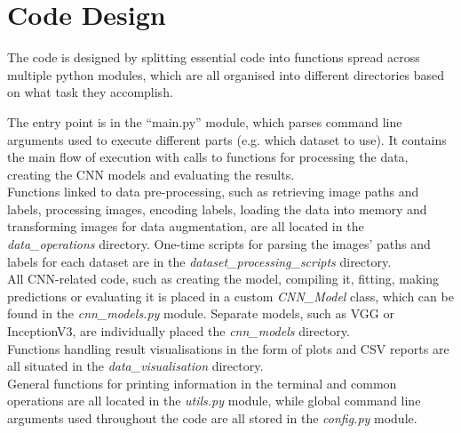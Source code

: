 
\section{Code Design}

The code is designed by splitting essential code into functions spread across multiple python modules, which are all organised into different directories based on what task they accomplish.

The entry point is in the ``main.py'' module, which parses command line arguments used to execute different parts (e.g. which dataset to use). It contains the main flow of execution with calls to functions for processing the data, creating the CNN models and evaluating the results.\\

Functions linked to data pre-processing, such as retrieving image paths and labels, processing images, encoding labels, loading the data into memory and transforming images for data augmentation, are all located in the \textit{data\_operations} directory. One-time scripts for parsing the images' paths and labels for each dataset are in the \textit{dataset\_processing\_scripts} directory.\\

All CNN-related code, such as creating the model, compiling it, fitting, making predictions or evaluating it is placed in a custom \textit{CNN\_Model} class, which can be found in the \textit{cnn\_models.py} module. Separate models, such as VGG or InceptionV3, are individually placed the \textit{cnn\_models} directory.\\

Functions handling result visualisations in the form of plots and CSV reports are all situated in the \textit{data\_visualisation} directory.\\

General functions for printing information in the terminal and common operations are all located in the \textit{utils.py} module, while global command line arguments used throughout the code are all stored in the \textit{config.py} module.